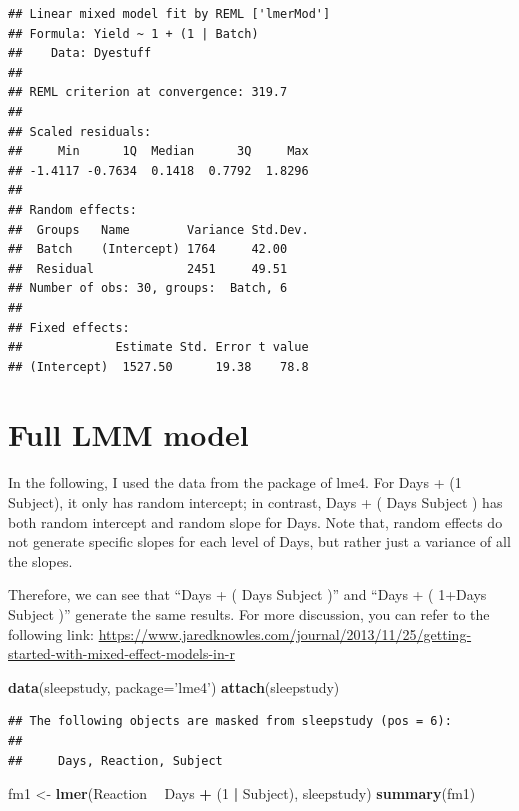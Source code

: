 \documentclass[]{book}
\newenvironment{Shaded}{\begin{snugshade}}{\end{snugshade}}
\newcommand{\KeywordTok}[1]{\textcolor[rgb]{0.13,0.29,0.53}{\textbf{#1}}}
\newcommand{\DataTypeTok}[1]{\textcolor[rgb]{0.13,0.29,0.53}{#1}}
\newcommand{\DecValTok}[1]{\textcolor[rgb]{0.00,0.00,0.81}{#1}}
\newcommand{\StringTok}[1]{\textcolor[rgb]{0.31,0.60,0.02}{#1}}
\newcommand{\OperatorTok}[1]{\textcolor[rgb]{0.81,0.36,0.00}{\textbf{#1}}}
\newcommand{\NormalTok}[1]{#1}
\begin{document}
\begin{verbatim}
## Linear mixed model fit by REML ['lmerMod']
## Formula: Yield ~ 1 + (1 | Batch)
##    Data: Dyestuff
## 
## REML criterion at convergence: 319.7
## 
## Scaled residuals: 
##     Min      1Q  Median      3Q     Max 
## -1.4117 -0.7634  0.1418  0.7792  1.8296 
## 
## Random effects:
##  Groups   Name        Variance Std.Dev.
##  Batch    (Intercept) 1764     42.00   
##  Residual             2451     49.51   
## Number of obs: 30, groups:  Batch, 6
## 
## Fixed effects:
##             Estimate Std. Error t value
## (Intercept)  1527.50      19.38    78.8
\end{verbatim}

\section{Full LMM model}\label{full-lmm-model}

In the following, I used the data from the package of lme4. For Days +
(1 \textbar{} Subject), it only has random intercept; in contrast, Days
+ ( Days\textbar{} Subject ) has both random intercept and random slope
for Days. Note that, random effects do not generate specific slopes for
each level of Days, but rather just a variance of all the slopes.

Therefore, we can see that ``Days + ( Days\textbar{} Subject )'' and
``Days + ( 1+Days\textbar{} Subject )'' generate the same results. For
more discussion, you can refer to the following link:
\url{https://www.jaredknowles.com/journal/2013/11/25/getting-started-with-mixed-effect-models-in-r}

\begin{Shaded}
\begin{Highlighting}[]
\KeywordTok{data}\NormalTok{(sleepstudy, }\DataTypeTok{package=}\StringTok{'lme4'}\NormalTok{)}
\KeywordTok{attach}\NormalTok{(sleepstudy)}
\end{Highlighting}
\end{Shaded}

\begin{verbatim}
## The following objects are masked from sleepstudy (pos = 6):
## 
##     Days, Reaction, Subject
\end{verbatim}

\begin{Shaded}
\begin{Highlighting}[]
\NormalTok{fm1 <-}\StringTok{ }\KeywordTok{lmer}\NormalTok{(Reaction }\OperatorTok{~}\StringTok{ }\NormalTok{Days }\OperatorTok{+}\StringTok{ }\NormalTok{(}\DecValTok{1} \OperatorTok{|}\StringTok{ }\NormalTok{Subject), sleepstudy)}
\KeywordTok{summary}\NormalTok{(fm1)}
\end{Highlighting}
\end{Shaded}
\end{document}
